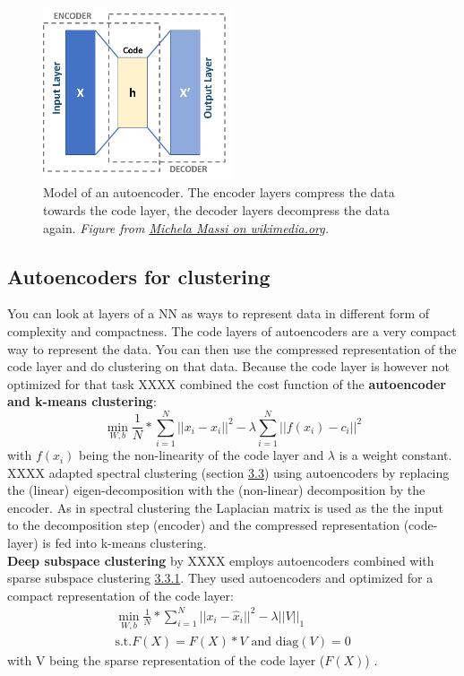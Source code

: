 \documentclass[
]{book}
\begin{document}
\centering

\begin{figure}
\centering
\includegraphics[width=0.5\textwidth,height=\textheight]{./figures/Autoencoder_schema.png}
\caption{Model of an autoencoder. The encoder layers compress the data towards
the code layer, the decoder layers decompress the data again. \emph{Figure
from \href{https://commons.wikimedia.org/wiki/File:Autoencoder_schema.png}{Michela Massi on
wikimedia.org}.}}
\end{figure}

\hypertarget{autoencoders-for-clustering}{%
\subsection{Autoencoders for clustering}\label{autoencoders-for-clustering}}

You can look at layers of a NN as ways to represent data in different
form of complexity and compactness. The code layers of autoencoders are
a very compact way to represent the data. You can then use the
compressed representation of the code layer and do clustering on that
data. Because the code layer is however not optimized for that task XXXX
combined the cost function of the \textbf{autoencoder and k-means
clustering}:
\[\min_{W,b} \frac{1}{N}*\sum_{i=1}^N ||x_i - \hat{x}_i||^2 - \lambda \sum_{i=1}^N ||f(x_i) - c_i||^2\]
with \(f(x_i)\) being the non-linearity of the code layer and \(\lambda\) is
a weight constant.\\
XXXX adapted spectral clustering (section
\protect\hyperlink{Spectralux5cux2520Clustering}{3.3}) using autoencoders by replacing the
(linear) eigen-decomposition with the (non-linear) decomposition by the
encoder. As in spectral clustering the Laplacian matrix is used as the
the input to the decomposition step (encoder) and the compressed
representation (code-layer) is fed into k-means clustering.\\
\textbf{Deep subspace clustering} by XXXX employs autoencoders combined with
sparse subspace clustering \protect\hyperlink{SSP}{3.3.1}. They used autoencoders and optimized for a compact
representation of the code layer: \[\begin{split}
                \min_{W,b} \frac{1}{N}*\sum_{i=1}^N ||x_i - \hat{x}_i||^2 - \lambda ||V||_1 \\
                \text{s.t.} F(X) = F(X)*V \text{ and diag}(V)=0
            \end{split}\] with V being the sparse representation of the
code layer (\(F(X)\)) .
\end{document}
